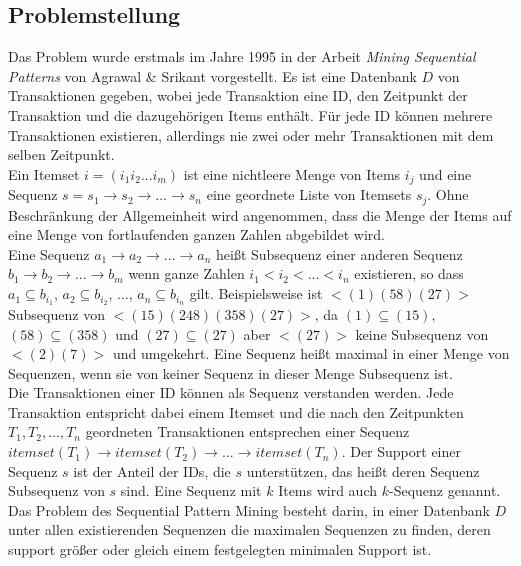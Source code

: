 \subsection{Problemstellung}
Das Problem wurde erstmals im Jahre 1995 in der Arbeit \textit{Mining Sequential Patterns} \cite{aprioriall} von Agrawal \& Srikant vorgestellt. Es ist eine Datenbank $D$ von Transaktionen gegeben, wobei jede Transaktion eine ID, den Zeitpunkt der Transaktion und die dazugehörigen Items enthält. Für jede ID können mehrere Transaktionen existieren, allerdings nie zwei oder mehr Transaktionen mit dem selben Zeitpunkt.\\
Ein Itemset $i=(i_1i_2...i_m)$ ist eine nichtleere Menge von Items $i_j$ und eine Sequenz $s=s_1\rightarrow s_2\rightarrow ...\rightarrow s_n$ eine geordnete Liste von Itemsets $s_j$. Ohne Beschränkung der Allgemeinheit wird angenommen, dass die Menge der Items auf eine Menge von fortlaufenden ganzen Zahlen abgebildet wird.\\
Eine Sequenz $a_1\rightarrow a_2\rightarrow ...\rightarrow a_n$ heißt Subsequenz einer anderen Sequenz $b_1\rightarrow b_2\rightarrow ...\rightarrow b_m$ wenn ganze Zahlen $i_1<i_2<...<i_n$ existieren, so dass $a_1\subseteq b_{i_1}$, $a_2\subseteq b_{i_2}$, ..., $a_n\subseteq b_{i_n}$ gilt. Beispielsweise ist $<(1)(58)(27)>$ Subsequenz von $<(15)(248)(358)(27)>$, da $(1)\subseteq(15)$, $(58)\subseteq(358)$ und $(27)\subseteq(27)$ aber $<(27)>$ keine Subsequenz von $<(2)(7)>$ und umgekehrt. Eine Sequenz heißt maximal in einer Menge von Sequenzen, wenn sie von keiner Sequenz in dieser Menge Subsequenz ist.\\
Die Transaktionen einer ID können als Sequenz verstanden werden. Jede Transaktion entspricht dabei einem Itemset und die nach den Zeitpunkten $T_1,T_2,...,T_n$ geordneten Transaktionen entsprechen einer Sequenz $itemset(T_1)\rightarrow itemset(T_2)\rightarrow ...\rightarrow itemset(T_n)$. Der Support einer Sequenz $s$ ist der Anteil der IDs, die $s$ unterstützen, das heißt deren Sequenz Subsequenz von $s$ sind. Eine Sequenz mit $k$ Items wird auch $k$-Sequenz genannt.\\
Das Problem des Sequential Pattern Mining besteht darin, in einer Datenbank $D$ unter allen existierenden Sequenzen die maximalen Sequenzen zu finden, deren support größer oder gleich einem festgelegten minimalen Support ist.

